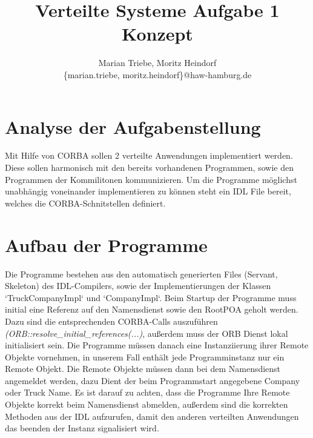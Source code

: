 \documentclass{article}
\begin{document}
\date{}

\title{Verteilte Systeme Aufgabe 1 Konzept}

\author{
  Marian Triebe, Moritz Heindorf\\
  \{marian.triebe, moritz.heindorf\}@haw-hamburg.de
}

\maketitle

\section{Analyse der Aufgabenstellung}
Mit Hilfe von CORBA sollen 2 verteilte Anwendungen implementiert werden. Diese sollen harmonisch mit den bereits vorhandenen Programmen, sowie den Programmen der Kommilitonen kommunizieren. Um die Programme möglichst unabhängig voneinander implementieren zu können steht ein IDL File bereit, welches die CORBA-Schnitstellen definiert. 

\section{Aufbau der Programme}
Die Programme bestehen aus den automatisch generierten Files (Servant, Skeleton) des IDL-Compilers, sowie der Implementierungen der Klassen `TruckCompanyImpl` und `CompanyImpl`. Beim Startup der Programme muss initial eine Referenz auf den Namensdienst sowie den RootPOA geholt werden. Dazu sind die entsprechenden CORBA-Calls auszuführen \textit{\tiny(ORB::resolve\_initial\_references(...)}, außerdem muss der ORB Dienst lokal initialisiert sein. Die Programme müssen danach eine Instanziierung ihrer Remote Objekte vornehmen, in unserem Fall enthält jede Programminstanz nur ein Remote Objekt. Die Remote Objekte müssen dann bei dem Namensdienst angemeldet werden, dazu Dient der beim Programmstart angegebene Company oder Truck Name. Es ist darauf zu achten, dass die Programme Ihre Remote Objekte korrekt beim Namensdienst abmelden, außerdem sind die korrekten Methoden aus der IDL aufzurufen, damit den anderen verteilten Anwendungen das beenden der Instanz signalisiert wird.
\end{document}
